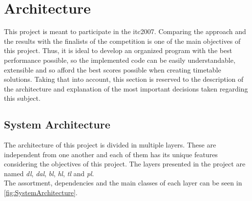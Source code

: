 \chapter{Architecture}
\label{Architecture}
\thispagestyle{plain}

This project is meant to participate in the \gls{itc2007}. Comparing the approach and the results with the finalists of the competition is one of the main objectives of this project. Thus, it is ideal to develop an organized program with the best performance possible, so the implemented code can be easily understandable, extensible and so afford the best scores possible when creating timetable solutions. Taking that into account, this section is reserved to the description of the architecture and explanation of the most important decisions taken regarding this subject.

\section{System Architecture}

The architecture of this project is divided in multiple layers. These are independent from one another and each of them has its unique features considering the objectives of this project. The layers presented in the project are named \textit{\gls{dl}}, \textit{\gls{dal}}, \textit{\gls{bl}}, \textit{\gls{hl}}, \textit{\gls{tl}} and \textit{\gls{pl}}. \\

The assortment, dependencies and the main classes of each layer can be seen in \ref{fig:SystemArchitecture}.

